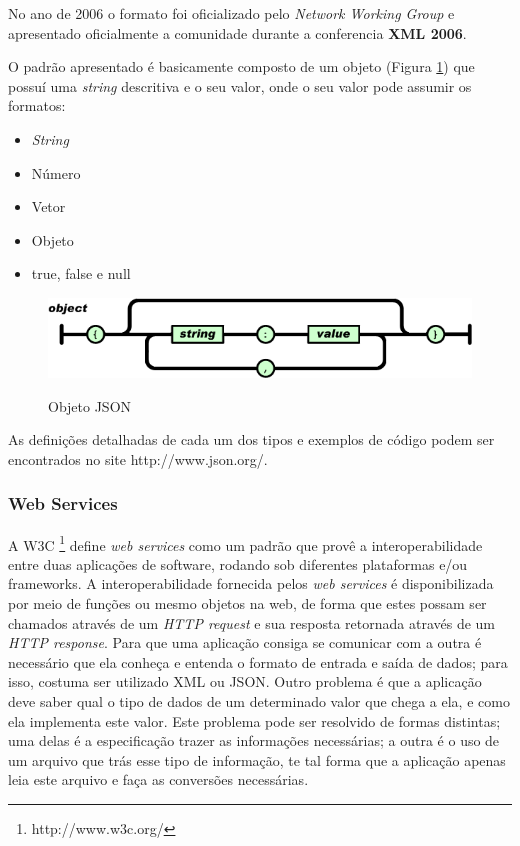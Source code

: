 No ano de 2006 o formato foi oficializado pelo \emph{Network Working Group} e apresentado oficialmente a
comunidade durante a conferencia \textbf{XML 2006}.

O padrão apresentado é basicamente composto de um objeto (Figura \ref{fig:json_obj}) que possuí uma \emph{string}
descritiva e o seu valor, onde o seu valor pode assumir os formatos:

\begin{itemize}
    \item \emph{String}
    \item Número
    \item Vetor
    \item Objeto
    \item true, false e null
\end{itemize}

\begin{figure}[ht]
\begin{center}
\scalebox{0.6} {
    \includegraphics{img/json_obj.png}}
\end{center}
  \caption{Objeto JSON}
  \label{fig:json_obj}
\end{figure}

As definições detalhadas de cada um dos tipos e exemplos de código podem ser encontrados no site
http://www.json.org/.

\subsubsection{Web Services}

A W3C \footnote{http://www.w3c.org/} define \emph{web services} como um padrão que provê a
interoperabilidade entre duas aplicações de software, rodando sob diferentes plataformas e/ou
frameworks.
A interoperabilidade fornecida pelos \emph{web services} é disponibilizada por meio de funções
ou mesmo objetos na web, de forma que estes possam ser chamados através de um \emph{HTTP
request} e sua resposta retornada através de um \emph{HTTP response}.
Para que uma aplicação consiga se comunicar com a outra é necessário que ela conheça
e entenda o formato de entrada e saída de dados; para isso, costuma ser utilizado XML ou JSON.
Outro problema é que a aplicação deve saber qual o tipo de dados de um determinado
valor que chega a ela, e como ela implementa este valor. Este problema pode ser resolvido
de formas distintas; uma delas é a especificação trazer as informações necessárias; a outra
é o uso de um arquivo que trás esse tipo de informação, te tal forma que a aplicação
apenas leia este arquivo e faça as conversões necessárias. 

